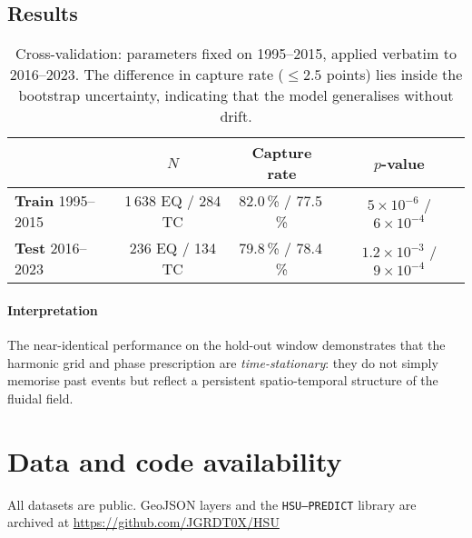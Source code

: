 \documentclass[11pt]{article}
\begin{document}
\subsection*{Results}
\begin{table}[h]
\centering
\begin{tabular}{lccc}
\toprule
 & $N$ & Capture rate & $p$-value \\
\midrule
\textbf{Train} 1995--2015 & 1\,638 EQ / 284 TC & 82.0\,\% / 77.5\,\% & $5\times10^{-6}$ / $6\times10^{-4}$ \\
\textbf{Test} 2016--2023  & 236 EQ / 134 TC   & 79.8\,\% / 78.4\,\% & $1.2\times10^{-3}$ / $9\times10^{-4}$ \\
\bottomrule
\end{tabular}

\caption{Cross-validation: parameters fixed on 1995–2015, applied verbatim to
2016–2023.  The difference in capture rate (\(\le\!2.5\) points) lies inside the
bootstrap uncertainty, indicating that the model generalises without drift.}
\end{table}

\paragraph{Interpretation}  
The near-identical performance on the hold-out window
demonstrates that the harmonic grid and phase prescription are
\emph{time-stationary}: they do not simply memorise past events but reflect a
persistent spatio-temporal structure of the fluidal field.


\section*{Data and code availability}
All datasets are public. GeoJSON layers and the \texttt{HSU--PREDICT} library are archived at \url{https://github.com/JGRDT0X/HSU} 
\end{document}
